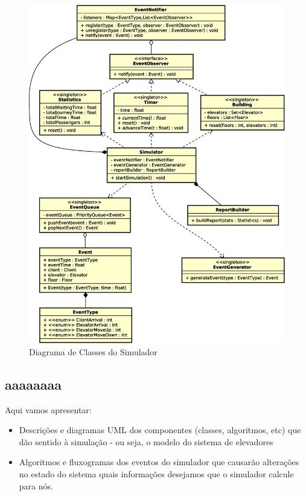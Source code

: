 \begin{figure}[htb!]
  \centering
  \includegraphics[scale=0.6]{img/simulator.eps}
  \caption{Diagrama de Classes do Simulador}
\label{fig:diagram:simulator}
\end{figure}

\subsection{aaaaaaaa}

Aqui vamos apresentar:

\begin{itemize}
  \item Descrições e diagramas UML dos componentes (classes, algoritmos, etc)
que dão sentido à simulação - ou seja, o modelo do sistema de elevadores
  \item Algoritmos e fluxogramas dos eventos do simulador que causarão
alterações no estado do sistema quais informações desejamos que o simulador
calcule para nós.
\end{itemize}

